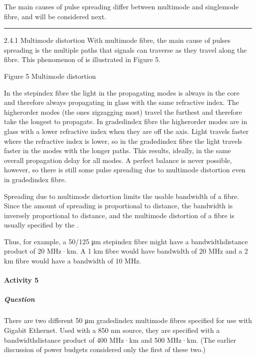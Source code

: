 \documentclass[letterpaper,10pt,english]{sphinxmanual}
\let\sphinxpxdimen\pdfpxdimen\else\newdimen\sphinxpxdimen
\begin{document}
The main causes of pulse spreading differ between multimode and single\sphinxhyphen{}mode fibre, and will be considered next.


\bigskip\hrule\bigskip


2.4.1 Multimode distortion With multimode fibre, the main cause of pulses spreading is the multiple paths that signals can traverse as they travel along the fibre. This phenomenon of  is illustrated in Figure 5.

\sphinxincludegraphics[width=511\sphinxpxdimen,height=248\sphinxpxdimen]{{t305_005i}.jpg}

Figure 5 Multimode distortion

In the step\sphinxhyphen{}index fibre the light in the propagating modes is always in the core and therefore always propagating in glass with the same refractive index. The higher\sphinxhyphen{}order modes (the ones zig\sphinxhyphen{}zagging most) travel the furthest and therefore take the longest to propagate. In graded\sphinxhyphen{}index fibre the higher\sphinxhyphen{}order modes are in glass with a lower refractive index when they are off the axis. Light travels faster where the refractive index is lower, so in the graded\sphinxhyphen{}index fibre the light travels faster
in the modes with the longer paths. This results, ideally, in the same overall propagation delay for all modes. A perfect balance is never possible, however, so there is still some pulse spreading due to multimode distortion even in graded\sphinxhyphen{}index fibre.

Spreading due to multimode distortion limits the usable bandwidth of a fibre. Since the amount of spreading is proportional to distance, the bandwidth is inversely proportional to distance, and the multimode distortion of a fibre is usually specified by the .

Thus, for example, a 50/125 μm step\sphinxhyphen{}index fibre might have a bandwidth\sphinxhyphen{}distance product of 20 MHz·km. A 1 km fibre would have bandwidth of 20 MHz and a 2 km fibre would have a bandwidth of 10 MHz.


\paragraph{Activity 5}
\label{\detokenize{content/session_00/Part_00_02:Activity-5}}

\subparagraph{Question}
\label{\detokenize{content/session_00/Part_00_02:id13}}
There are two different 50 μm graded\sphinxhyphen{}index multimode fibres specified for use with Gigabit Ethernet. Used with a 850 nm source, they are specified with a bandwidth\sphinxhyphen{}distance product of 400 MHz·km and 500 MHz·km. (The earlier discussion of power budgets considered only the first of these two.)
\end{document}

